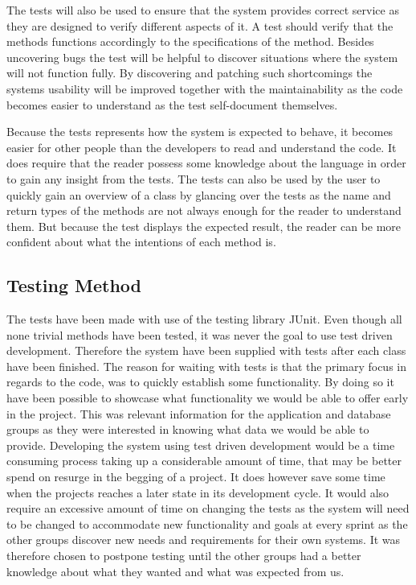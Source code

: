 The tests will also be used to ensure that the system provides correct service as they are designed to verify different aspects of it.
A test should verify that the methods functions accordingly to the specifications of the method.
Besides uncovering bugs the test will be helpful to discover situations where the system will not function fully.
By discovering and patching such shortcomings the systems usability will be improved together with the maintainability as the code becomes easier to understand as the test self-document themselves. 

Because the tests represents how the system is expected to behave, it becomes easier for other people than the developers to read and understand the code.
It does require that the reader possess some knowledge about the language in order to gain any insight from the tests.
The tests can also be used by the user to quickly gain an overview of a class by glancing over the tests as the name and return types of the methods are not always enough for the reader to understand them.
But because the test displays the expected result, the reader can be more confident about what the intentions of each method is.

\subsection{Testing Method}
The tests have been made with use of the testing library JUnit\cite{junit4}.
Even though all none trivial methods have been tested, it was never the goal to use test driven development.
Therefore the system have been supplied with tests after each class have been finished. 
The reason for waiting with tests is that the primary focus in regards to the code, was to quickly establish some functionality. 
By doing so it have been possible to showcase what functionality we would be able to offer early in the project.%
This was relevant information for the application and database groups as they were interested in knowing what data we would be able to provide.
Developing the system using test driven development would be a time consuming process taking up a considerable amount of time, that may be better spend on resurge in the begging of a project.
It does however save some time when the projects reaches a later state in its development cycle.
It would also require an excessive amount of time on changing the tests as the system will need to be changed to accommodate new functionality and goals at every sprint as the other groups discover new needs and requirements for their own systems.
It was therefore chosen to postpone testing until the other groups had a better knowledge about what they wanted and what was expected from us.